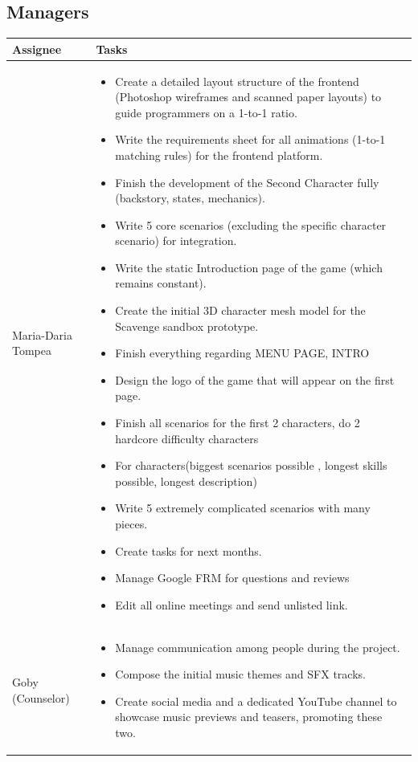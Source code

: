 \documentclass[11pt,a4paper]{article}
\begin{document}
\subsection*{Managers}
\begin{tabularx}{\textwidth}{@{} l X @{}}
\toprule
\textbf{Assignee} & \textbf{Tasks} \\
\midrule
Maria-Daria Tompea & 
\begin{itemize}[leftmargin=*, nosep]
    \item Create a detailed layout structure of the frontend (Photoshop wireframes and scanned paper layouts) to guide programmers on a 1-to-1 ratio.
    \item Write the requirements sheet for all animations (1-to-1 matching rules) for the frontend platform.
    \item Finish the development of the Second Character fully (backstory, states, mechanics).
    \item Write 5 core scenarios (excluding the specific character scenario) for integration.
    \item Write the static Introduction page of the game (which remains constant).
    \item Create the initial 3D character mesh model for the Scavenge sandbox prototype.
    \item Finish everything regarding MENU PAGE, INTRO
    \item Design the logo of the game that will appear on the first page.
    \item Finish all scenarios for the first 2 characters, do 2 hardcore difficulty characters
    \item For characters(biggest scenarios possible , longest skills possible, longest description)
    \item Write 5 extremely complicated scenarios with many pieces.
    \item Create tasks for next months.
    \item Manage Google FRM for questions and reviews
    \item Edit all online meetings and send unlisted link.
\end{itemize} \\
\midrule
Goby (Counselor) & 
\begin{itemize}[leftmargin=*, nosep]
    \item Manage communication among people during the project.
    \item Compose the initial music themes and SFX tracks.
    \item Create social media and a dedicated YouTube channel to showcase music previews and teasers, promoting these two.
\end{itemize} \\
\bottomrule
\end{tabularx}
\end{document}
